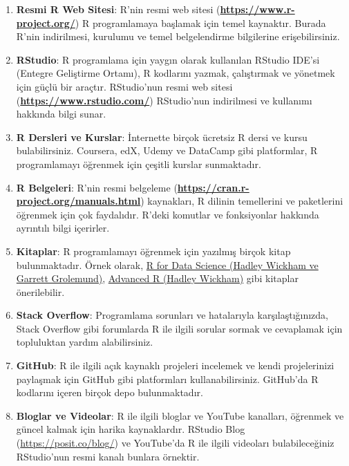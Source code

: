 \documentclass[
  letterpaper,
  DIV=11,
  numbers=noendperiod]{scrreprt}
\begin{document}
\begin{enumerate}
\def\labelenumi{\arabic{enumi}.}
\item
  \textbf{Resmi R Web Sitesi}: R'nin resmi web sitesi
  (\href{https://www.r-project.org/}{\textbf{https://www.r-project.org/}})
  R programlamaya başlamak için temel kaynaktır. Burada R'nin
  indirilmesi, kurulumu ve temel belgelendirme bilgilerine
  erişebilirsiniz.
\item
  \textbf{RStudio}: R programlama için yaygın olarak kullanılan RStudio
  IDE'si (Entegre Geliştirme Ortamı), R kodlarını yazmak, çalıştırmak ve
  yönetmek için güçlü bir araçtır. RStudio'nun resmi web sitesi
  (\href{https://www.rstudio.com/}{\textbf{https://www.rstudio.com/}})
  RStudio'nun indirilmesi ve kullanımı hakkında bilgi sunar.
\item
  \textbf{R Dersleri ve Kurslar}: İnternette birçok ücretsiz R dersi ve
  kursu bulabilirsiniz. Coursera, edX, Udemy ve DataCamp gibi
  platformlar, R programlamayı öğrenmek için çeşitli kurslar
  sunmaktadır.
\item
  \textbf{R Belgeleri}: R'nin resmi belgeleme
  (\href{https://cran.r-project.org/manuals.html}{\textbf{https://cran.r-project.org/manuals.html}})
  kaynakları, R dilinin temellerini ve paketlerini öğrenmek için çok
  faydalıdır. R'deki komutlar ve fonksiyonlar hakkında ayrıntılı bilgi
  içerirler.
\item
  \textbf{Kitaplar}: R programlamayı öğrenmek için yazılmış birçok kitap
  bulunmaktadır. Örnek olarak, \href{https://r4ds.hadley.nz/}{R for Data
  Science (Hadley Wickham ve Garrett Grolemund)},
  \href{https://adv-r.hadley.nz/}{Advanced R (Hadley Wickham)} gibi
  kitaplar önerilebilir.
\item
  \textbf{Stack Overflow}: Programlama sorunları ve hatalarıyla
  karşılaştığınızda, Stack Overflow gibi forumlarda R ile ilgili sorular
  sormak ve cevaplamak için topluluktan yardım alabilirsiniz.
\item
  \textbf{GitHub}: R ile ilgili açık kaynaklı projeleri incelemek ve
  kendi projelerinizi paylaşmak için GitHub gibi platformları
  kullanabilirsiniz. GitHub'da R kodlarını içeren birçok depo
  bulunmaktadır.
\item
  \textbf{Bloglar ve Videolar}: R ile ilgili bloglar ve YouTube
  kanalları, öğrenmek ve güncel kalmak için harika kaynaklardır. RStudio
  Blog
  (\href{https://posit.co/blog/}{https://posit.co/blog}\href{https://posit.co/blog/}{/})
  ve YouTube'da R ile ilgili videoları bulabileceğiniz RStudio'nun resmi
  kanalı bunlara örnektir.
\end{enumerate}
\end{document}
